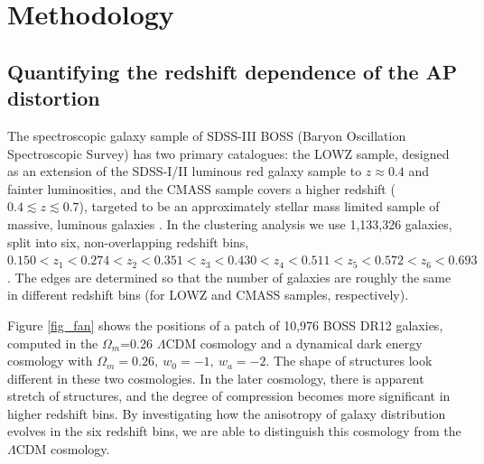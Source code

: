 \documentclass[iop]{emulateapj}
\begin{document}



\section{Methodology}

\subsection{Quantifying the redshift dependence of the AP distortion}

The spectroscopic galaxy sample of SDSS-III BOSS (Baryon Oscillation Spectroscopic Survey) has two primary catalogues:
the LOWZ sample, designed as an extension of the SDSS-I/II luminous red galaxy sample to $z\approx 0.4$ and fainter luminosities,
and the CMASS sample covers a higher redshift ($0.4\lesssim z \lesssim 0.7$),
targeted to be an approximately stellar mass limited sample of massive, luminous galaxies \citep{Reidetal:2016}.
In the clustering analysis we use 1,133,326 galaxies, split into six, non-overlapping redshift bins, 
$0.150<z_1<0.274<z_2<0.351<z_3<0.430<z_4<0.511<z_5<0.572<z_6<0.693$.
The edges are determined so that the number of galaxies are roughly the same in different redshift bins 
(for LOWZ and CMASS samples, respectively).


Figure \ref{fig_fan} shows the positions of a patch of 10,976 BOSS DR12 galaxies,
computed in the $\Omega_m$=0.26 $\Lambda$CDM cosmology and a dynamical dark energy cosmology with $\Omega_m=0.26,\ w_0=-1,\ w_a=-2$.
The shape of structures look different in these two cosmologies. 
In the later cosmology, there is apparent stretch of structures, 
and the degree of compression becomes more significant in higher redshift bins.
By investigating how the anisotropy of galaxy distribution evolves in the six redshift bins,
we are able to distinguish this cosmology from the $\Lambda$CDM cosmology.
\end{document}
